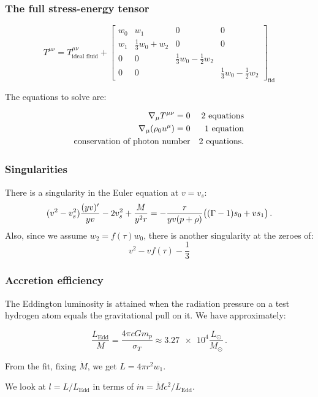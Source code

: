 \documentclass{beamer}
\begin{document}
\begin{frame}
    \frametitle{The full stress-energy tensor}

    \begin{equation*}
    T^{\mu\nu} =
    T^{\mu\nu}_{\text{ideal fluid}} +
    \begin{bmatrix}
    w_0   & w_1  & 0  & 0 \\
    w_1   & \frac{1}{3}w_0 + w_2  &  0  & 0 \\
      0 & 0  &  \frac{1}{3}w_0 -\frac{1}{2}w_2 &  \\
      0 & 0  &   & \frac{1}{3}w_0 -\frac{1}{2}w_2
    \end{bmatrix} _{\text{fid}}
    \end{equation*}

    The equations to solve are:

    \begin{subequations}
    \begin{align*}
      \nabla_\mu T^{\mu\nu} = 0 && \text{2 equations} \\
      \nabla_\mu \qty(\rho_0 u^\mu) = 0&& \text{1 equation} \\
      \text{conservation of photon number} && \text{2 equations.}
    \end{align*}
    \end{subequations}
\end{frame}

\begin{frame}
    \frametitle{Singularities}
    There is a singularity in the Euler equation at \(v = v_s\):
        \begin{equation*}
        (v^2 - v_s^2) \frac{(yv) ^{\prime}}{yv} - 2 v_s^2 + \frac{M}{y^2 r}
        = -\frac{r}{yv (p + \rho)} \qty((\Gamma-1)s_0 + v s_1)\,.
        \end{equation*}
    Also, since we assume \(w_2 = f(\tau) w_0\), there is another singularity at the zeroes of:
    \begin{equation*}
        v^2 - v f(\tau) - \frac{1}{3}
    \end{equation*}
\end{frame}

\begin{frame}
    \frametitle{Accretion efficiency}
    The Eddington luminosity is attained when the radiation pressure on a test hydrogen atom equals the gravitational pull on it. We have approximately:

    \begin{equation*}
        \frac{L_{\text{Edd}}}{M} = \frac{4 \pi c G m_p}{\sigma_T} \approx \num{3.27e4} \frac{L_{\odot}}{M_{\odot}}  \,.
    \end{equation*}

    From the fit, fixing \(\dot{M}\), we get \(L = 4 \pi r^2 w_1\).

    We look at \(l = L / L_{\text{Edd}}\) in terms of \(\dot{m} = \dot{M} c^2 / L_{\text{Edd}}\).
\end{frame}
\end{document}
